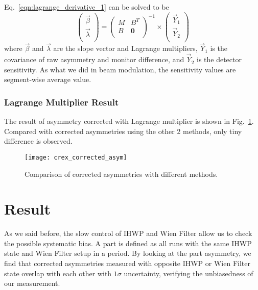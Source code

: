 Eq.~\ref{eqn:lagrange_derivative_1} can be solved to be
\begin{equation}
    \begin{pmatrix}
	\vec{\beta} \\
	\vec{\lambda}	\\
    \end{pmatrix}
    =
    \begin{pmatrix}
	M   & B^T   \\
	B   & \bm{0}	\\
    \end{pmatrix}^{-1}
    \times
    \begin{pmatrix}
	\vec{Y}_1   \\
	\vec{Y}_2   \\
    \end{pmatrix}
\end{equation}
where $\vec{\beta}$ and $\vec{\lambda}$ are the slope vector and Lagrange multipliers,
$\vec{Y}_1$ is the covariance of raw asymmetry and monitor difference, and $\vec{Y}_2$
is the detector sensitivity. As what we did in beam modulation, the sensitivity
values are segment-wise average value.

\subsubsection{Lagrange Multiplier Result}
The result of asymmetry corrected with Lagrange multiplier is shown in 
Fig.~\ref{fig:crex_corrected_asym}. Compared with corrected asymmetries using
the other 2 methods, only tiny difference is observed.
\begin{figure}[H]
    \centering
    \texttt{[image: crex\_corrected\_asym]}
    \caption{Comparison of corrected asymmetries with different methods.}
    \label{fig:crex_corrected_asym}
\end{figure}

\section{Result}
As we said before, the slow control of IHWP and Wien Filter allow us to check
the possible systematic bias. A part is defined as all runs with the same IHWP state
and Wien Filter setup in a period. By looking at the part asymmetry, we find that 
corrected asymmetries measured with opposite IHWP or Wien Filter state overlap
with each other with $1\sigma$ uncertainty, verifying the unbiasedness of our
measurement.

